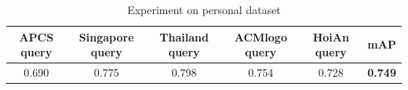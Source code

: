 \begin{table}[h!]
  \centering
  
  \begin{tabular}{cccccc}
    \toprule
    APCS query & Singapore query & Thailand query & ACMlogo query & HoiAn query & \textbf{mAP} \\
    \midrule
    0.690 & 0.775 & 0.798 & 0.754 & 0.728 & \textbf{0.749} \\
    \bottomrule
  \end{tabular}
  \caption{Experiment on personal dataset}
  \label{tab:detail_result}
\end{table}